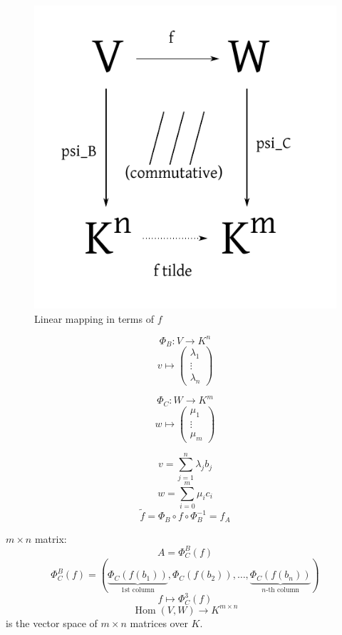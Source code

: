 \documentclass[a4paper,landscape,twocolumn]{article}
\DeclareMathOperator\Hom{Hom} %
\begin{document}
\begin{figure}[t]
  \begin{center}
    \includegraphics{img/linear_mapping.pdf}
    \caption{Linear mapping in terms of $f$}
    \label{img:lm}
  \end{center}
\end{figure}

\[ \Phi_B:  V \to K^n \]
\[ v \mapsto \begin{pmatrix} \lambda_1 \\ \vdots \\ \lambda_n \end{pmatrix} \]

\[ \Phi_C: W \to K^m \]
\[ w \mapsto \begin{pmatrix} \mu_1 \\ \vdots \\ \mu_m \end{pmatrix} \]

\[ v = \sum_{j=1}^n \lambda_j b_j \]
\[ w = \sum_{i=0}^m \mu_i c_i \]
\[ \tilde{f} = \Phi_B \circ f \circ \Phi_B^{-1} = f_A \]

$m\times n$ matrix:
\[ A = \Phi_C^B(f) \]
\[
  \Phi_C^B(f) = \left(
    \underbrace{\Phi_C(f(b_1))}_{\text{1st column}},
    \Phi_C(f(b_2)),
    \ldots,
    \underbrace{\Phi_C(f(b_n))}_{\text{$n$-th column}}
  \right)
\]
\[ f \mapsto \Phi_C^3(f) \]
\[ \Hom(V, W) \to K^{m\times n} \]
is the vector space of $m\times n$ matrices over $K$.
\end{document}
